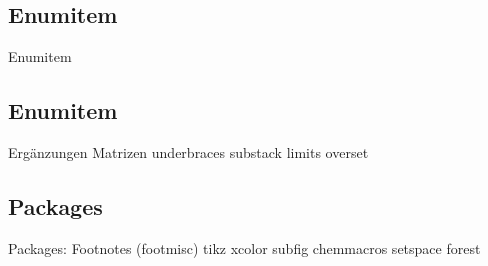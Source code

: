 \documentclass["WS\space 16-17\space -\space LaTeX-Kurs\space -\space Praesentation\space -\space 4.tex"]{subfiles}
\begin{document}
\subsection{Enumitem}
\begin{frame}[c]
	\begin{center}
		\large Enumitem
	\end{center}
\end{frame}
\subsection{Enumitem}
\begin{frame}[c]
	\begin{center}
		\large Ergänzungen Matrizen  underbraces substack limits overset 
	\end{center}
\end{frame}


\subsection{Packages}
\begin{frame}[c]
	\begin{center}
		\large Packages:  Footnotes (footmisc)  
		tikz  xcolor subfig  chemmacros setspace forest
	\end{center}
\end{frame}


\end{document}
